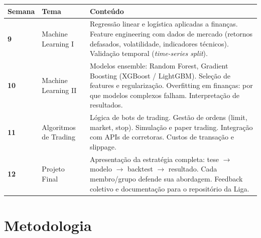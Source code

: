 \documentclass[12pt,a4paper]{article}
\begin{document}
\vspace{0.3cm}
\renewcommand{\arraystretch}{1.5}
\begin{tabularx}{\textwidth}{C{1.8cm} L{3.5cm} X}
    \toprule
    \textbf{Semana} & \textbf{Tema} & \textbf{Conteúdo} \\
    \midrule
    
    \textbf{9} & Machine Learning I &
    Regressão linear e logística aplicadas a finanças. Feature engineering com dados de mercado (retornos defasados, volatilidade, indicadores técnicos). Validação temporal (\textit{time-series split}). \\
    
    \textbf{10} & Machine Learning II &
    Modelos ensemble: Random Forest, Gradient Boosting (XGBoost / LightGBM). Seleção de features e regularização. Overfitting em finanças: por que modelos complexos falham. Interpretação de resultados. \\
    
    \textbf{11} & Algoritmos de Trading &
    Lógica de bots de trading. Gestão de ordens (limit, market, stop). Simulação e paper trading. Integração com APIs de corretoras. Custos de transação e slippage. \\
    
    \textbf{12} & Projeto Final &
    Apresentação da estratégia completa: tese $\rightarrow$ modelo $\rightarrow$ backtest $\rightarrow$ resultado. Cada membro/grupo defende sua abordagem. Feedback coletivo e documentação para o repositório da Liga. \\
    
    \bottomrule
\end{tabularx}

\section{Metodologia}
\end{document}
